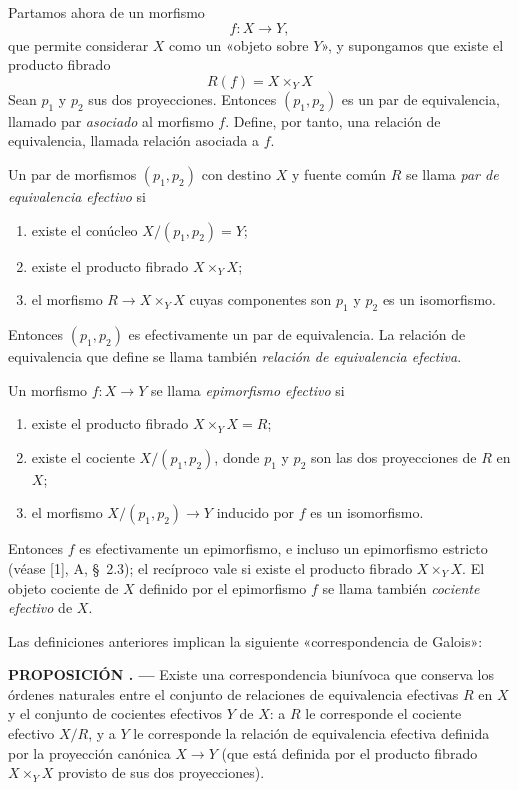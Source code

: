 \documentclass[11pt,twoside,openany]{book}
\numberwithin{equation}{section}
\newcommand{\src}[1]{%
  \phantomsection\hypertarget{src:#1}{}%
  \marginpar{\raggedleft\footnotesize\sffamily #1}%
}
\theoremstyle{plain}
\theoremstyle{definition}
\theoremstyle{remark}
\newcommand{\result}[2]{%
  \par\medskip\noindent\textbf{#1%
  \if\relax\detokenize{#2}\relax\else\space#2\fi. ---}\enspace
}
\newcommand{\FgaUnitKey}{frontmatter}
\renewcommand{\src}[1]{%
  \phantomsection\hypertarget{src:\FgaUnitKey:#1}{}%
  \marginpar{\raggedleft\footnotesize\sffamily #1}%
}
\theoremstyle{plain}
\theoremstyle{definition}
\theoremstyle{remark}
\begin{document}
Partamos ahora de un morfismo
\[
  f:X\longrightarrow Y,
\]
que permite considerar $X$ como un «objeto sobre $Y$», y supongamos que existe
el producto fibrado
\[
  R(f)=X\times_Y X
\]
Sean $p_1$ y $p_2$ sus dos proyecciones. Entonces $(p_1,p_2)$ es un par de
equivalencia, llamado par \emph{asociado} al morfismo $f$. Define, por tanto,
una relación de equivalencia, llamada relación asociada a $f$.

Un par de morfismos $(p_1,p_2)$ con destino $X$ y fuente común $R$ se llama
\emph{par de equivalencia efectivo} si
\begin{enumerate}
  \item[(i)] existe el conúcleo $X/(p_1,p_2)=Y$;
  \item[(ii)] existe el producto fibrado $X\times_Y X$;
  \item[(iii)] el morfismo $R\longrightarrow X\times_Y X$ cuyas componentes son
  $p_1$ y $p_2$ es un isomorfismo.
\end{enumerate}
Entonces $(p_1,p_2)$ es efectivamente un par de equivalencia. La relación de
equivalencia que define se llama también \emph{relación de equivalencia
efectiva}.

Un morfismo $f:X\longrightarrow Y$ se llama \emph{epimorfismo efectivo} si
\begin{enumerate}
  \item[(i)] existe el producto fibrado $X\times_Y X=R$;
  \item[(ii)] existe el cociente $X/(p_1,p_2)$, donde $p_1$ y $p_2$ son las dos
  proyecciones de $R$ en $X$;
  \item[(iii)] el morfismo $X/(p_1,p_2)\longrightarrow Y$ inducido por $f$ es un
  isomorfismo.
\end{enumerate}
Entonces $f$ es efectivamente un epimorfismo, e incluso un epimorfismo
estricto (véase [1], A, \S~2.3); el recíproco vale si existe el producto
fibrado $X\times_Y X$. El objeto cociente de $X$ definido por el epimorfismo
$f$ se llama también \emph{cociente efectivo} de $X$.

Las definiciones anteriores implican la siguiente «correspondencia de
Galois»:

\src{102}
\result{PROPOSICIÓN}{1.1} Existe una correspondencia biunívoca que conserva
los órdenes naturales entre el conjunto de relaciones de equivalencia
efectivas $R$ en $X$ y el conjunto de cocientes efectivos $Y$ de $X$: a $R$
le corresponde el cociente efectivo $X/R$, y a $Y$ le corresponde la relación
de equivalencia efectiva definida por la proyección canónica
$X\longrightarrow Y$ (que está definida por el producto fibrado
$X\times_Y X$ provisto de sus dos proyecciones).
\end{document}
